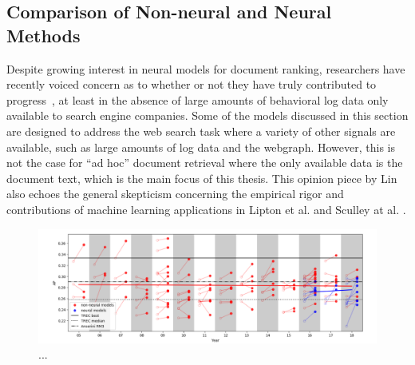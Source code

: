 \subsection{Comparison of Non-neural and Neural Methods}

Despite growing interest in neural models for document ranking, researchers have recently voiced concern as to whether or not they have truly contributed to progress~\cite{lin2019neural}, at least in the absence of large amounts of behavioral log data only available to search engine companies.
Some of the models discussed in this section are designed to address the web search task where a variety of other signals are available, such as large amounts of log data and the webgraph.
However, this is not the case for ``ad hoc'' document retrieval where the only available data is the document text, which is the main focus of this thesis.
This opinion piece by Lin~\cite{lin2019neural} also echoes the general skepticism concerning the empirical rigor and contributions of machine learning applications in Lipton et al. \cite{lipton2018troubling} and Sculley at al. \cite{sculley2018winner}.

\begin{figure}[b!]
\centering
  \includegraphics[width=6.5in]{neural_robust04.png}
\caption{...}
\label{fig:neural_robust04}
\end{figure}

